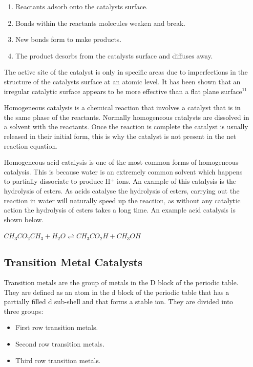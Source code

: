 \begin{enumerate}
\item Reactants adsorb onto the catalysts surface.
\item Bonds within the reactants molecules weaken and break.
\item New bonds form to make products.
\item The product desorbs from the catalysts surface and diffuses away.
\end{enumerate}

The active site of the catalyst is only in specific areas due to imperfections in the structure of the catalysts surface at an atomic level. It has been shown that an irregular catalytic surface appears to be more effective than a flat plane surface$^{11}$

Homogeneous catalysis is a chemical reaction that involves a catalyst that is in the same phase of the reactants. Normally homogeneous catalysts are dissolved in a solvent with the reactants. Once the reaction is complete the catalyst is usually released in their initial form, this is why the catalyst is not present in the net reaction equation.

Homogeneous acid catalysis is one of the most common forms of homogeneous catalysis. This is because water is an extremely common solvent which happens to partially dissociate to produce H$^+$ ions. An example of this catalysis is the hydrolysis of esters. As acids catalyse the hydrolysis of esters, carrying out the reaction in water will naturally speed up the reaction, as without any catalytic action the hydrolysis of esters takes a long time. An example acid catalysis is shown below.

$CH_3CO_2CH_3 + H_2O \rightleftharpoons CH_3CO_2H + CH_3OH$




	
	\subsection{Transition Metal Catalysts}

Transition metals are the group of metals in the D block of the periodic table. They are defined as an atom in the d block of the periodic table that has a partially filled d sub-shell and that forms a stable ion. They are divided into three groups:

\begin{itemize}
\item First row transition metals.
\item Second row transition metals.
\item Third row transition metals.
\end{itemize}


